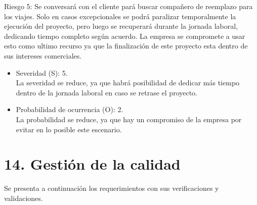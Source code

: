 \documentclass[
11pt, %
]{charter}
\begin{document}
Riesgo 5: Se conversará con el cliente pará buscar compañero de reemplazo para los viajes. Solo en casos excepcionales se podrá paralizar temporalmente la ejecución del proyecto, pero luego se recuperará durante la jornada laboral, dedicando tiempo completo según acuerdo. La empresa se compromete a usar esto como ultimo recurso ya que la finalización de este proyecto esta dentro de sus intereses comerciales.
\begin{itemize}
  \item Severidad (S): 5. \\
   La severidad se reduce, ya que habrá posibilidad de dedicar más tiempo dentro de la jornada laboral en caso se retrase el proyecto.
  \item Probabilidad de ocurrencia (O): 2.\\
  La probabilidad se reduce, ya que hay un compromiso de la empresa por evitar en lo posible este escenario.
\end{itemize}


\section{14. Gestión de la calidad}
\label{sec:calidad}
Se presenta a continuación los requerimientos con sus verificaciones y validaciones.
\end{document}
